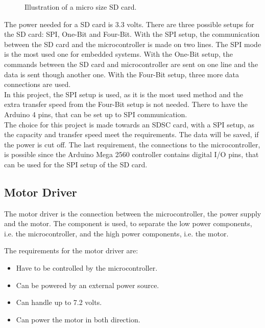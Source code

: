 \begin{minipage}{\linewidth}
\begin{minipage}{0.30\linewidth}
\begin{figure}[H]
              \caption{Illustration of a micro size SD card.} %
              \label{SDcardpinout}
          \end{figure}
      \end{minipage}
      
  \end{minipage}



The power needed for a SD card is 3.3 volts. There are three possible setups for the SD card: SPI, One-Bit and Four-Bit.
With the SPI setup, the communication between the SD card and the microcontroller is made on two lines. The SPI mode is the most used one for embedded systems.
With the One-Bit setup, the commands between the SD card and microcontroller are sent on one line and the data is sent though another one.
With the Four-Bit setup, three more data connections are used.\\
%
In this project, the SPI setup is used, as it is the most used method and the extra transfer speed from the Four-Bit setup is not needed. There to have the Arduino 4 pins, that can be set up to SPI communication.\\

The choice for this project is made towards an SDSC card, with a SPI setup, as the capacity and transfer speed meet the requirements. The data will be saved, if the power is cut off. The last requirement, the connections to the microcontroller, is possible since the Arduino Mega 2560 controller contains digital I/O pins, that can be used for the SPI setup of the SD card.


\subsection{Motor Driver}
The motor driver is the connection between the microcontroller, the power supply and the motor. The component is used, to separate the low power components, i.e. the microcontroller, and the high power components, i.e. the motor.

The requirements for the motor driver are:
\begin{itemize}
\item Have to be controlled by the microcontroller.
\item Can be powered by an external power source.
\item Can handle up to 7.2 volts.
\item Can power the motor in both direction.
\end{itemize}

